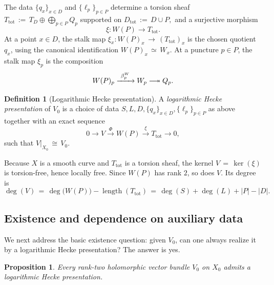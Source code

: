 \documentclass[a4paper,12pt]{amsart}
\numberwithin{equation}{section}
\newtheorem{proposition}[theorem]{Proposition}
\theoremstyle{definition}
\newtheorem{definition}[theorem]{Definition}
\newcommand{\degc}{\operatorname{deg}}
\newcommand{\lengthop}{\operatorname{length}}
\newcommand{\longtwoheadrightarrow}{\mathrel{\relbar\joinrel\twoheadrightarrow}}
\begin{document}
The data \(\{q_x\}_{x\in D}\) and \(\{\ell_p\}_{p\in P}\) determine a torsion sheaf
\(
T_{\mathrm{tot}}\,:=\,T_D\oplus \bigoplus_{p\in P}Q_p
\)
supported on
\(
D_{\mathrm{tot}}\,:=\,D\cup P,
\)
and a surjective morphism
\[
\xi:W(P)\longrightarrow T_{\mathrm{tot}}.
\]
At a point \(x\in D\), the stalk map \(\xi_x:W(P)_x\,\longrightarrow\, (T_{\mathrm{tot}})_x\) is the chosen quotient \(q_x\), using the canonical identification \(W(P)_x\,\simeq\, W_x\).  At a puncture \(p\in P\), the stalk map \(\xi_p\) is the composition
\[
W(P)_p\xrightarrow{\ \beta_p^W\ } W_p\longtwoheadrightarrow Q_p.
\]

\begin{definition}[Logarithmic Hecke presentation]\label{def:log-hecke}
A \emph{logarithmic Hecke presentation} of \(V_0\) is a choice of data \(S,L,D,\{q_x\}_{x\in D},\{\ell_p\}_{p\in P}\) as above together with an exact sequence
\begin{equation}\label{eq:log-hecke}
0\longrightarrow V \xrightarrow{\ \Phi\ } W(P)\xrightarrow{\ \xi\ } T_{\mathrm{tot}}\longrightarrow 0,
\end{equation}
such that \(V|_{X_0}\,\cong\, V_0\).
\end{definition}

\smallskip

Because \(X\) is a smooth curve and \(T_{\mathrm{tot}}\) is a torsion sheaf, the kernel \(V\,=\,\ker(\xi)\) is torsion-free, hence locally free.  Since \(W(P)\) has rank \(2\), so does \(V\).  Its degree is
\[
\degc(V)\,=\,\degc\bigl(W(P)\bigr)-\lengthop(T_{\mathrm{tot}})
\,=\,\degc(S)+\degc(L)+|P|-|D|.
\]

\medskip 


\subsection{Existence and dependence on auxiliary data}
\label{sec:existence-canonicity}

We next address the basic existence question: given \(V_0\), can one always realize it by a logarithmic Hecke presentation?  The answer is yes.

\begin{proposition}\label{prop:existence-log-hecke}
Every rank-two holomorphic vector bundle \(V_0\) on \(X_0\) admits a logarithmic Hecke presentation.
\end{proposition}
\end{document}
